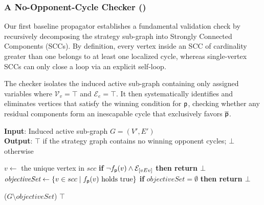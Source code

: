 \documentclass[a4paper,fleqn]{cas-sc}
\begin{document}
\subsubsection{A No-Opponent-Cycle Checker  (\nocchecker)} \label{sec:nocchecker}

Our first baseline propagator establishes a fundamental validation check by recursively decomposing the strategy sub-graph into Strongly Connected Components (SCCs). By definition, every vertex inside an SCC of cardinality greater than one belongs to at least one localized cycle, whereas single-vertex SCCs can only close a loop via an explicit self-loop. 

The checker isolates the induced active sub-graph containing only assigned variables where $\mathcal{V}_v = \top$ and $\mathcal{E}_e = \top$. It then systematically identifies and eliminates vertices that satisfy the winning condition for $\mathsf{p}$, checking whether any residual components form an inescapable cycle that exclusively favors $\overline{\mathsf{p}}$.

\begin{algorithm}[htb]
\small
\caption{\textbf{\nocchecker}}
\textbf{Input}: Induced active sub-graph $G = (V', E')$ \\
\textbf{Output}: $\top$ if the strategy graph contains no winning opponent cycles; $\bot$ otherwise
\begin{algorithmic}[1]
     \label{alg:nocchecker:breakingdown}
         \label{alg:nocchecker:single}
            \STATE $v \gets$ the unique vertex in $scc$
            \STATE \textbf{if } $\neg f_{\mathsf{p}}(v) \land \mathcal{E}_{[vEv]}$ \textbf{then return $\bot$} \label{alg:nocchecker:self}  
        \ELSE
            \STATE $ \textit{objectiveSet} \gets \{ v \in scc \mid 
            f_{\mathsf{p}}(v) \text{ holds true}
            \}$ \label{alg:nocchecker:best}
            \STATE \textbf{if } $ \textit{objectiveSet} = \emptyset$ \textbf{then return $\bot$} \label{alg:nocchecker:opponent}

            \STATE \nocchecker($G \setminus \textit{objectiveSet}$) \label{alg:nocchecker:recursion}
        \ENDIF
    \ENDFOR
    \RETURN $\top$
\end{algorithmic}
\label{alg:nocchecker}
\end{algorithm}
\end{document}

